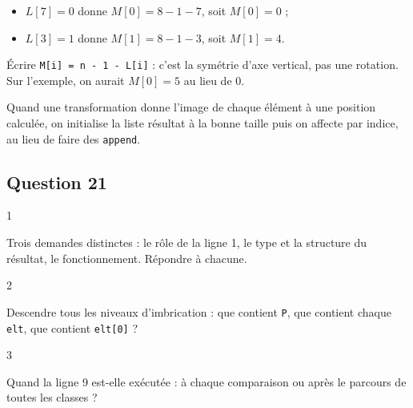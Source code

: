 \documentclass[11pt,a4paper]{article}
\providecommand{\tightlist}{\setlength{\itemsep}{0pt}\setlength{\parskip}{0pt}}
\begin{document}
\begin{itemize}
\tightlist
\item
  \(L[7] = 0\) donne \(M[0] = 8 - 1 - 7\), soit \(M[0] = 0\) ;
\item
  \(L[3] = 1\) donne \(M[1] = 8 - 1 - 3\), soit \(M[1] = 4\).
\end{itemize}

\begin{piege}

Écrire \texttt{M{[}i{]}\allowbreak{}\ =\allowbreak{}\ n\ -\ 1\ -\ L{[}i{]}\allowbreak{}} : c'est la symétrie d'axe vertical, pas une rotation. Sur l'exemple, on aurait \(M[0] = 5\) au lieu de \(0\).

\end{piege}

\begin{methode}

Quand une transformation donne l'image de chaque élément à une position calculée, on initialise la liste résultat à la bonne taille puis on affecte par indice, au lieu de faire des \texttt{append}.

\end{methode}

\hypertarget{question-21}{%
\subsection{Question 21}\label{question-21}}

\begin{indication}{1}

Trois demandes distinctes : le rôle de la ligne 1, le type et la structure du résultat, le fonctionnement. Répondre à chacune.

\end{indication}

\begin{indication}{2}

Descendre tous les niveaux d'imbrication : que contient \texttt{P}, que contient chaque \texttt{elt}, que contient \texttt{elt{[}0{]}} ?

\end{indication}

\begin{indication}{3}

Quand la ligne 9 est-elle exécutée : à chaque comparaison ou après le parcours de toutes les classes ?

\end{indication}
\end{document}

